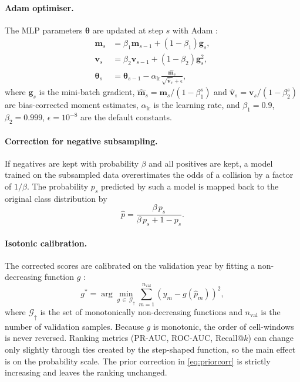 \paragraph{Adam optimiser.}
The MLP parameters $\bm{\theta}$ are updated at step $s$ with Adam \cite{kingma2015adam}:
\begin{equation}
\begin{aligned}
\mathbf{m}_s &= \beta_1 \mathbf{m}_{s-1} + (1-\beta_1)\mathbf{g}_s,\\
\mathbf{v}_s &= \beta_2 \mathbf{v}_{s-1} + (1-\beta_2)\mathbf{g}_s^{2},\\
\bm{\theta}_s &= \bm{\theta}_{s-1} - \alpha_{\text{lr}} \frac{\hat{\mathbf{m}}_s}{\sqrt{\hat{\mathbf{v}}_s} + \epsilon},
\end{aligned}
\label{eq:adam}
\end{equation}
where $\mathbf{g}_s$ is the mini-batch gradient, $\hat{\mathbf{m}}_s=\mathbf{m}_s/(1-\beta_1^{s})$ and $\hat{\mathbf{v}}_s=\mathbf{v}_s/(1-\beta_2^{s})$ are bias-corrected moment estimates, $\alpha_{\text{lr}}$ is the learning rate, and $\beta_1=0.9$, $\beta_2=0.999$, $\epsilon=10^{-8}$ are the default constants.

\paragraph{Correction for negative subsampling.}
If negatives are kept with probability $\beta$ and all positives are kept, a model trained on the subsampled data overestimates the odds of a collision by a factor of $1/\beta$. The probability $p_s$ predicted by such a model is mapped back to the original class distribution by \cite{king2001logistic,dalpozzolo2015calibrating}
\begin{equation}
\hat{p} = \frac{\beta\, p_s}{\beta\, p_s + 1 - p_s}.
\label{eq:priorcorr}
\end{equation}

\paragraph{Isotonic calibration.}
The corrected scores are calibrated on the validation year by fitting a non-decreasing function $g$ \cite{zadrozny2002transforming,niculescu2005predicting}:
\begin{equation}
g^{*} = \arg\min_{g \,\in\, \mathcal{G}_{\uparrow}} \sum_{m=1}^{n_{\text{val}}} \left( y_m - g(\hat{p}_m) \right)^2,
\label{eq:isotonic}
\end{equation}
where $\mathcal{G}_{\uparrow}$ is the set of monotonically non-decreasing functions and $n_{\text{val}}$ is the number of validation samples. Because $g$ is monotonic, the order of cell-windows is never reversed. Ranking metrics (PR-AUC, ROC-AUC, Recall@$k$) can change only slightly through ties created by the step-shaped function, so the main effect is on the probability scale. The prior correction in \cref{eq:priorcorr} is strictly increasing and leaves the ranking unchanged.

